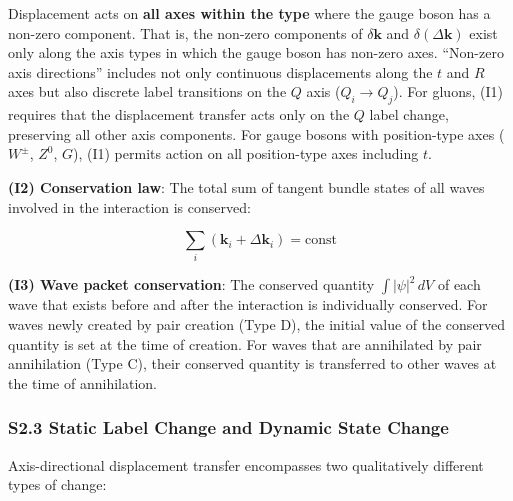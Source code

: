 \documentclass[
  a4paper,11pt]{article}
\theoremstyle{definition}
\theoremstyle{remark}
\begin{document}
Displacement acts on \textbf{all axes within the type} where the gauge
boson has a non-zero component. That is, the non-zero components of
\(\delta\mathbf{k}\) and \(\delta(\Delta\mathbf{k})\) exist only along
the axis types in which the gauge boson has non-zero axes. ``Non-zero
axis directions'' includes not only continuous displacements along the
\(t\) and \(R\) axes but also discrete label transitions on the \(Q\)
axis (\(Q_i \to Q_j\)). For gluons, (I1) requires that the displacement
transfer acts only on the \(Q\) label change, preserving all other axis
components. For gauge bosons with position-type axes (\(W^{\pm}\),
\(Z^0\), \(G\)), (I1) permits action on all position-type axes including
\(t\).

\textbf{(I2) Conservation law}: The total sum of tangent bundle states
of all waves involved in the interaction is conserved:

\[\sum_i (\mathbf{k}_i + \Delta\mathbf{k}_i) = \text{const}\]

\textbf{(I3) Wave packet conservation}: The conserved quantity
\(\int |\psi|^2 \, dV\) of each wave that exists before and after the
interaction is individually conserved. For waves newly created by pair
creation (Type D), the initial value of the conserved quantity is set at
the time of creation. For waves that are annihilated by pair
annihilation (Type C), their conserved quantity is transferred to other
waves at the time of annihilation.

\subsubsection{S2.3 Static Label Change and Dynamic State
Change}\label{s2.3-static-label-change-and-dynamic-state-change}

Axis-directional displacement transfer encompasses two qualitatively
different types of change:
\end{document}
